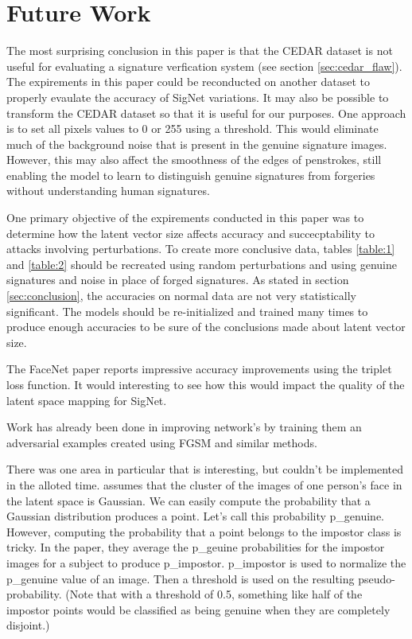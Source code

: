 \section{Future Work}\label{sec:future_work}

The most surprising conclusion in this paper is that the CEDAR dataset is not useful for evaluating a signature verfication system (see section \ref{sec:cedar_flaw}).
The expirements in this paper could be reconducted on another dataset to properly evaulate the accuracy of SigNet variations.
It may also be possible to transform the CEDAR dataset so that it is useful for our purposes.
One approach is to set all pixels values to 0 or 255 using a threshold.
This would eliminate much of the background noise that is present in the genuine signature images.
However, this may also affect the smoothness of the edges of penstrokes, still enabling the model to learn to distinguish genuine signatures from forgeries without understanding human signatures.

One primary objective of the expirements conducted in this paper was to determine how the latent vector size affects accuracy and succecptability to attacks involving perturbations.
To create more conclusive data, tables \ref{table:1} and \ref{table:2} should be recreated using random perturbations and using genuine signatures and noise in place of forged signatures.
As stated in section \ref{sec:conclusion}, the accuracies on normal data are not very statistically significant.
The models should be re-initialized and trained many times to produce enough accuracies to be sure of the conclusions made about latent vector size.

The FaceNet paper reports impressive accuracy improvements using the triplet loss function.
It would interesting to see how this would impact the quality of the latent space mapping for SigNet.

Work has already been done in improving network's by training them an adversarial examples created using FGSM and similar methods.

There was one area in particular that is interesting, but couldn't be implemented in the alloted time.
\cite{LeCun} assumes that the cluster of the images of one person's face in the latent space is Gaussian.
We can easily compute the probability that a Gaussian distribution produces a point.
Let's call this probability p\_genuine.
However, computing the probability that a point belongs to the impostor class is tricky.
In the paper, they average the p\_geuine probabilities for the impostor images for a subject to produce p\_impostor.
p\_impostor is used to normalize the p\_genuine value of an image.
Then a threshold is used on the resulting pseudo-probability.
(Note that with a threshold of 0.5, something like half of the impostor points would be classified as being genuine when they are completely disjoint.)

